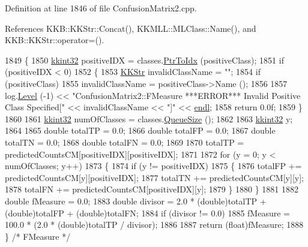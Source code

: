 Definition at line 1846 of file Confusion\+Matrix2.\+cpp.



References K\+K\+B\+::\+K\+K\+Str\+::\+Concat(), K\+K\+M\+L\+L\+::\+M\+L\+Class\+::\+Name(), and K\+K\+B\+::\+K\+K\+Str\+::operator=().


\begin{DoxyCode}
1849 \{
1850   \hyperlink{namespace_k_k_b_a8fa4952cc84fda1de4bec1fbdd8d5b1b}{kkint32} positiveIDX = classes.\hyperlink{class_k_k_b_1_1_k_k_queue_ac7c26abdf599669a4b0898534f735f99}{PtrToIdx} (positiveClass);
1851   \textcolor{keywordflow}{if}  (positiveIDX < 0)
1852   \{
1853     \hyperlink{class_k_k_b_1_1_k_k_str}{KKStr} invalidClassName = \textcolor{stringliteral}{""};
1854     \textcolor{keywordflow}{if}  (positiveClass)
1855        invalidClassName = positiveClass->Name ();
1856 
1857     log.\hyperlink{class_k_k_b_1_1_run_log_a32cf761d7f2e747465fd80533fdbb659}{Level} (-1) << \textcolor{stringliteral}{"ConfusionMatrix2::FMeasure         ***ERROR***      Invalid Positive Class
       Specified["} << invalidClassName << \textcolor{stringliteral}{"]"} << \hyperlink{namespace_k_k_b_ad1f50f65af6adc8fa9e6f62d007818a8}{endl};
1858     \textcolor{keywordflow}{return} 0.0f;
1859   \}
1860 
1861   \hyperlink{namespace_k_k_b_a8fa4952cc84fda1de4bec1fbdd8d5b1b}{kkint32}  numOfClasses = classes.\hyperlink{class_k_k_b_1_1_k_k_queue_a1dab601f75ee6a65d97f02bddf71c40d}{QueueSize} ();
1862 
1863   \hyperlink{namespace_k_k_b_a8fa4952cc84fda1de4bec1fbdd8d5b1b}{kkint32}  y;
1864 
1865   \textcolor{keywordtype}{double}  totalTP = 0.0;
1866   \textcolor{keywordtype}{double}  totalFP = 0.0;
1867   \textcolor{keywordtype}{double}  totalTN = 0.0;
1868   \textcolor{keywordtype}{double}  totalFN = 0.0;
1869 
1870   totalTP = predictedCountsCM[positiveIDX][positiveIDX];
1871 
1872   \textcolor{keywordflow}{for}  (y = 0;  y < numOfClasses;  y++)
1873   \{
1874     \textcolor{keywordflow}{if}  (y != positiveIDX)
1875     \{
1876       totalFP += predictedCountsCM[y][positiveIDX];
1877       totalTN += predictedCountsCM[y][y];
1878       totalFN += predictedCountsCM[positiveIDX][y];
1879     \}
1880   \}
1881 
1882   \textcolor{keywordtype}{double}  fMeasure = 0.0;
1883   \textcolor{keywordtype}{double}  divisor = 2.0 * (double)totalTP + (\textcolor{keywordtype}{double})totalFP + (double)totalFN;
1884   \textcolor{keywordflow}{if}  (divisor != 0.0)
1885      fMeasure = 100.0 * (2.0 * (double)totalTP / divisor);
1886 
1887   \textcolor{keywordflow}{return}  (\textcolor{keywordtype}{float})fMeasure;
1888 \}  \textcolor{comment}{/* FMeasure */}
\end{DoxyCode}
